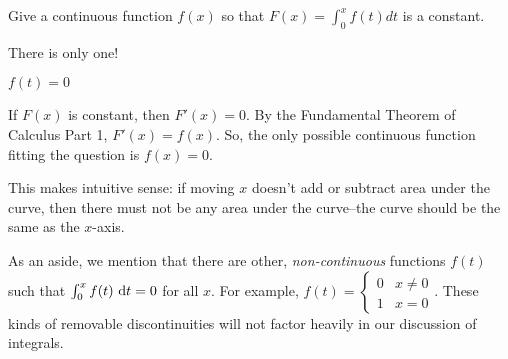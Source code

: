\begin{question}
Give a continuous function $f(x)$ so that $F(x) = \displaystyle\int_0^x f(t)dt$ is a constant.
\end{question}
\begin{hint}
There is only one!
\end{hint}
\begin{answer}
$f(t)=0$
\end{answer}
\begin{solution}
If $F(x)$ is constant, then $F'(x)=0$. By the Fundamental Theorem of Calculus Part 1, $F'(x)=f(x)$. So, the only possible continuous function fitting the question is $f(x)=0$.

This makes intuitive sense: if moving $x$ doesn't add or subtract area under the curve, then there must not be any area under the curve--the curve should be the same as the $x$-axis.

As an aside, we mention that there are other, \emph{non-continuous} functions $f(t)$ such that $\int_0^x f(t)\ \mathrm{d}t = 0$ for all $x$. For example, $f(t) = \left\{\begin{array}{cc}
0 & x \neq 0\\
1 & x=0
\end{array}\right.$. These kinds of removable discontinuities will not factor heavily in our discussion of integrals.
\end{solution}

